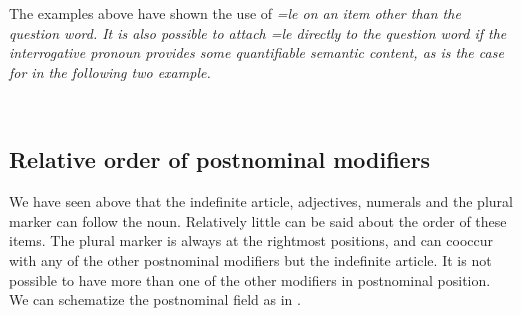 The examples above have shown the use of \em =le \em on an item other than the question word. It is also possible to attach \em =le \em directly to the question word if the interrogative pronoun provides some quantifiable semantic content, as is the case for   in the following two example.





 \\












\subsection{Relative order of postnominal modifiers}\label{sec:nppp:Relativeorderofpostnominalmodifiers}
We have seen above that  the indefinite article, adjectives, numerals and the plural marker can follow the noun. Relatively little can be said about the order of these items. The plural marker is always at the rightmost positions, and can cooccur with any of the other postnominal modifiers but the indefinite article.  It is not possible to have more than one of the other modifiers in postnominal position. We can schematize the postnominal field  as in .




